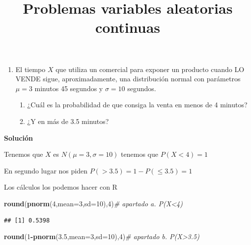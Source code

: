 \documentclass[
]{article}
\title{Problemas variables aleatorias continuas}
\author{}
\date{\vspace{-2.5em}}
\newenvironment{Shaded}{\begin{snugshade}}{\end{snugshade}}
\newcommand{\CommentTok}[1]{\textcolor[rgb]{0.56,0.35,0.01}{\textit{#1}}}
\newcommand{\DataTypeTok}[1]{\textcolor[rgb]{0.13,0.29,0.53}{#1}}
\newcommand{\DecValTok}[1]{\textcolor[rgb]{0.00,0.00,0.81}{#1}}
\newcommand{\FloatTok}[1]{\textcolor[rgb]{0.00,0.00,0.81}{#1}}
\newcommand{\KeywordTok}[1]{\textcolor[rgb]{0.13,0.29,0.53}{\textbf{#1}}}
\newcommand{\NormalTok}[1]{#1}
\newcommand{\OperatorTok}[1]{\textcolor[rgb]{0.81,0.36,0.00}{\textbf{#1}}}
\providecommand{\tightlist}{%
  \setlength{\itemsep}{0pt}\setlength{\parskip}{0pt}}
\begin{document}
\maketitle

\begin{enumerate}
\def\labelenumi{\arabic{enumi}.}
\tightlist
\item
  El tiempo \(X\) que utiliza un comercial para exponer un producto
  cuando LO VENDE sigue, aproximadamente, una distribución normal con
  parámetros \(\mu =3\) minutos 45 segundos y \(\sigma = 10\) segundos.

  \begin{enumerate}
  \def\labelenumii{\alph{enumii}.}
  \tightlist
  \item
    ¿Cuál es la probabilidad de que consiga la venta en menos de 4
    minutos?\\
  \item
    ¿Y en más de 3.5 minutos?
  \end{enumerate}
\end{enumerate}

\textbf{Solución}

Tenemos que \(X\) es \(N(\mu=3,\sigma=10)\) tenemos que \(P(X <4)=1\)

En segundo lugar nos piden \(P(>3.5)=1-P(\leq 3.5)=1\)

Los cálculos los podemos hacer con R

\begin{Shaded}
\begin{Highlighting}[]
\KeywordTok{round}\NormalTok{(}\KeywordTok{pnorm}\NormalTok{(}\DecValTok{4}\NormalTok{,}\DataTypeTok{mean=}\DecValTok{3}\NormalTok{,}\DataTypeTok{sd=}\DecValTok{10}\NormalTok{),}\DecValTok{4}\NormalTok{)}\CommentTok{\# apartado a. P(X\textless{}4)}
\end{Highlighting}
\end{Shaded}

\begin{verbatim}
## [1] 0.5398
\end{verbatim}

\begin{Shaded}
\begin{Highlighting}[]
\KeywordTok{round}\NormalTok{(}\DecValTok{1}\OperatorTok{{-}}\KeywordTok{pnorm}\NormalTok{(}\FloatTok{3.5}\NormalTok{,}\DataTypeTok{mean=}\DecValTok{3}\NormalTok{,}\DataTypeTok{sd=}\DecValTok{10}\NormalTok{),}\DecValTok{4}\NormalTok{)}\CommentTok{\# apartado b. P(X\textgreater{}3.5)}
\end{Highlighting}
\end{Shaded}
\end{document}
